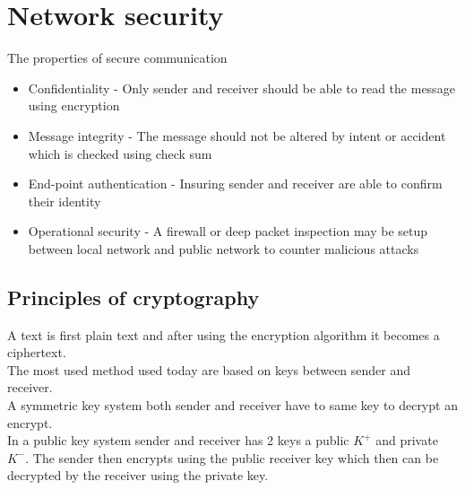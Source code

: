 \documentclass[12pt, a4paper]{article}
\begin{document}
	\section{Network security}
		The properties of secure communication
		\begin{itemize}
			\item Confidentiality - Only sender and receiver should be able to read the message using encryption
			\item Message integrity - The message should not be altered by intent or accident which is checked using check sum
			\item End-point authentication - Insuring sender and receiver are able to confirm their identity
			\item Operational security - A firewall or deep packet inspection may be setup between local network and public network to counter malicious attacks
		\end{itemize}
		\subsection{Principles of cryptography}
			A text is first plain text and after using the encryption algorithm it becomes a ciphertext.\\
			The most used method used today are based on keys between sender and receiver.\\
			A symmetric key system both sender and receiver have to same key to decrypt an encrypt.\\
			In a public key system sender and receiver has 2 keys a public $K^+$ and private $K^-$. The sender then encrypts using the public receiver key which then can be decrypted by the receiver using the private key.\\
\end{document}
